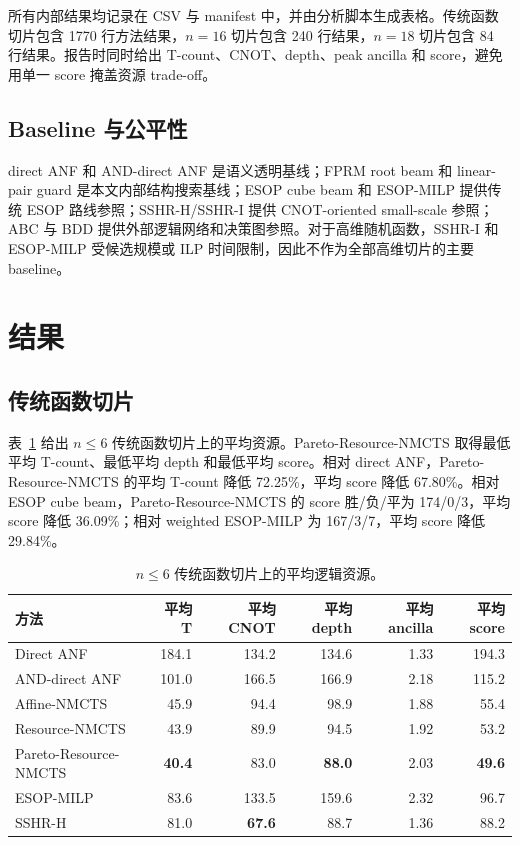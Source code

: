 \documentclass[UTF8,fontset=macnew,11pt]{ctexart}
\newcommand{\method}{Resource-NMCTS}
\newcommand{\pareto}{Pareto-Resource-NMCTS}
\begin{document}
所有内部结果均记录在 CSV 与 manifest 中，并由分析脚本生成表格。传统函数切片包含 1770 行方法结果，$n=16$ 切片包含 240 行结果，$n=18$ 切片包含 84 行结果。报告时同时给出 T-count、CNOT、depth、peak ancilla 和 score，避免用单一 score 掩盖资源 trade-off。

\subsection{Baseline 与公平性}

direct ANF 和 AND-direct ANF 是语义透明基线；FPRM root beam 和 linear-pair guard 是本文内部结构搜索基线；ESOP cube beam 和 ESOP-MILP 提供传统 ESOP 路线参照；SSHR-H/SSHR-I 提供 CNOT-oriented small-scale 参照；ABC 与 BDD 提供外部逻辑网络和决策图参照。对于高维随机函数，SSHR-I 和 ESOP-MILP 受候选规模或 ILP 时间限制，因此不作为全部高维切片的主要 baseline。

\section{结果}

\subsection{传统函数切片}

表~\ref{tab:traditional_mean} 给出 $n\leq6$ 传统函数切片上的平均资源。\pareto{} 取得最低平均 T-count、最低平均 depth 和最低平均 score。相对 direct ANF，\pareto{} 的平均 T-count 降低 72.25\%，平均 score 降低 67.80\%。相对 ESOP cube beam，\pareto{} 的 score 胜/负/平为 174/0/3，平均 score 降低 36.09\%；相对 weighted ESOP-MILP 为 167/3/7，平均 score 降低 29.84\%。

\begin{table}[t]
\centering
\small
\caption{$n\leq6$ 传统函数切片上的平均逻辑资源。}
\label{tab:traditional_mean}
\begin{tabular}{lrrrrr}
\toprule
方法 & 平均 T & 平均 CNOT & 平均 depth & 平均 ancilla & 平均 score \\
\midrule
Direct ANF & 184.1 & 134.2 & 134.6 & 1.33 & 194.3 \\
AND-direct ANF & 101.0 & 166.5 & 166.9 & 2.18 & 115.2 \\
Affine-NMCTS & 45.9 & 94.4 & 98.9 & 1.88 & 55.4 \\
\method{} & 43.9 & 89.9 & 94.5 & 1.92 & 53.2 \\
\pareto{} & \textbf{40.4} & 83.0 & \textbf{88.0} & 2.03 & \textbf{49.6} \\
ESOP-MILP & 83.6 & 133.5 & 159.6 & 2.32 & 96.7 \\
SSHR-H & 81.0 & \textbf{67.6} & 88.7 & 1.36 & 88.2 \\
\bottomrule
\end{tabular}
\end{table}
\end{document}
